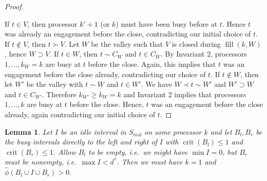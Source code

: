 \documentclass[a4paper]{article}
\DeclareMathOperator{\real}{real}
\DeclareMathOperator{\crit}{crit}
\DeclareMathOperator{\fillop}{fill}
\newtheorem{lemma}[theorem]{Lemma}
\begin{document}
\begin{proof}
\begin{figure}[H]
  \end{figure}
  If $t \in V$, then processor $k' + 1$ (or $k$) must have been busy before at $t$.
  Hence $t$ was already an engagement before the close, contradicting our initial choice of $t$.
  If $t \notin V$, then $t \succ V$.
  Let $W$ be the valley such that $V$ is closed during $\fillop(k, W)$, hence $W \supset V$.
  If $t \in W$, then $t \sim C_W$ and $t \in C_W$.
  By Invariant 2, processors $1, \ldots, k_W = k$ are busy at $t$ before the close.
  Again, this implies that $t$ was an engagement before the close already, contradicting our choice of $t$.
  If $t \notin W$, then let $W'$ be the valley with $t \sim W$ and $t \in W'$.
  We have $W \prec t \sim W'$ and $W' \supset W$ and $t \in C_{W'}$.
  Therefore $k_{W'} \geq k_W = k$ and Invariant 2 implies that processors $1, \ldots, k$ are busy at $t$ before the close.
  Hence, $t$ was an engagement before the close already, again contradicting our initial choice of $t$.
\end{proof}
\begin{lemma}\label{lemma:constellation}
  Let $I$ be an idle interval in $S_{\real}$ on some processor $k$ and let $B_l, B_r$ be the busy intervals directly to the left and right of $I$ with $\crit(B_l) \leq 1$ and $\crit(B_r) \leq 1$.
  Allow $B_l$ to be empty, i.e.\ we might have $\min I = 0$, but $B_r$ must be nonempty, i.e.\ $\max I < d^*$.
  Then we must have $k = 1$ and $\hat \phi(B_l \cup I \cup B_r) > 0$.
\end{lemma}
\end{document}
